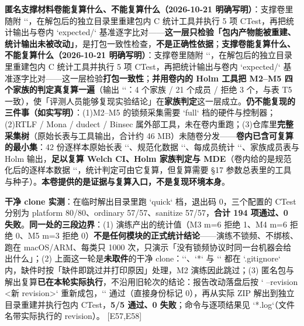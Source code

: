 \documentclass[UTF8,fontset=fandol,11pt,a4paper]{ctexart}
\begin{document}
\textbf{匿名支撑材料卷能复算什么、不能复算什么（2026-10-21 明确写明）}：支撑卷里随附 `\texttt{}`，在解包后的独立目录里重建包内 C 统计工具并执行 5 项 CTest，再把统计输出与卷内 `expected/` 基准逐字比对——\textbf{这一层只检验「包内产物能被重建、统计输出未被改动」}，是打包一致性检查，\textbf{不是正确性依据}；\textbf{支撑卷能复算什么、不能复算什么（2026-10-21 明确写明）}：支撑卷里随附 `\texttt{}`，在解包后的独立目录里重建包内 C 统计工具并执行 5 项 CTest，再把统计输出与卷内 `expected/` 基准逐字比对——这一层检验\textbf{打包一致性}；\textbf{并用卷内的 Holm 工具把 M2–M5 四个家族的判定真复算一遍}（输出 `\texttt{}`：4 个家族 / 21 个成员 / 拒绝 3 个，与表 T5 一致），使「评测人员能够复现实验结论」在\textbf{家族判定}这一层成立。\textbf{仍不能复现的三件事（如实写明）}：(1)M2–M5 的锁频采集需要 `full` 档的硬件与控制器；(2)RTLF / Mona / dudect / Binsec 属外部工具，未在卷内重跑；(3)仓库里\textbf{完整采集树}（原始长表与工具输出，合计约 46 MB）未随卷分发——\textbf{卷内已含可复算的最小集}：42 份逐样本原始长表 `\texttt{}`、规范化数据 `\texttt{}`、每成员统计 `\texttt{}`、家族成员表与 Holm 输出，\textbf{足以复算 Welch CI、Holm 家族判定与 MDE}（卷内给的是规范化后的逐样本数据 `\texttt{}`，统计判定可由它复算，但复算需要 §17 参数总表里的工具与种子）。\textbf{本卷提供的是证据与复算入口，不是复现环境本身}。


\textbf{干净 clone 实测}：在临时解出目录里跑 `quick` 档，退出码 0，三个配置的 CTest 分别为 platform 80/80、ordinary 57/57、sanitize 57/57，\textbf{合计 194 项通过、0 失败}。\textbf{同一处的三段边界}：(1) 演练产出的统计值（M3 m=6 拒绝 1、M4 m=6 拒绝 0、M5 m=3 拒绝 0）\textbf{不是任何模块的正式统计结论}——演练不锁频、不绑核、跑在 macOS/ARM、每类只 1000 次，只演示「没有锁频协议时同一台机器会给出什么」；(2) 上面这一轮是\textbf{未取件}的干净 clone：`\texttt{}`、`\texttt{}*` 与 `\texttt{}` 都在 `.gitignore` 内，缺件时按「缺件即跳过并打印原因」处理，M2 演练因此跳过；(3) 匿名包与解出复算\textbf{已在本轮实际执行}，不沿用旧轮次的结论：报告改动落盘后按 `\texttt{} --revision <新 revision>` 重新成包，`\texttt{}` 通过（直接身份标记 0），再从实际 ZIP 解出到独立目录重建并执行包内 CTest，\textbf{5/5 通过、0 失败}；命令与逐项结果见 `\texttt{}*.log`（文件名带实际执行的 revision）。 [E57,E58]
\end{document}
